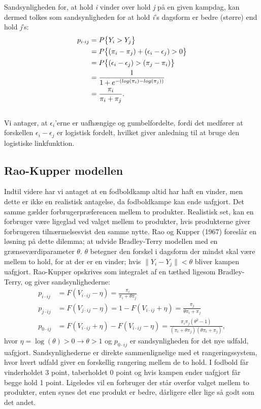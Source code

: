 \documentclass[11pt,a4paper]{article}
\begin{document}
Sandsynligheden for, at hold \textit{i} vinder over hold \textit{j} på en given kampdag, kan dermed tolkes som sandsynligheden for at hold \textit{i}'s dagsform er bedre (større) end hold \textit{j}'s:
\begin{align*}
p_{i\cdot ij}&=P\big{\{}Y_i>Y_j\big{\}}
\\&=P\big{\{}(\pi_i-\pi_j)+(\epsilon_i-\epsilon_j)>0\big{\}}
\\&=P\big{\{}(\epsilon_i-\epsilon_j)>(\pi_j-\pi_i)\big{\}}
\\&=\frac{1}{1+e^{-(log(\pi_i)-log(\pi_j))}} 
\\&=\frac{\pi_i}{\pi_i+\pi_j}.\;\;
\end{align*}
\\
Vi antager, at $\epsilon_i$'erne er uafhængige og gumbelfordelte, fordi det medfører at forskellen $\epsilon_i-\epsilon_j$ er logistisk fordelt, hvilket giver anledning til at bruge den logistiske linkfunktion.
\subsection{Rao-Kupper modellen}
Indtil videre har vi antaget at en fodboldkamp altid har haft en vinder, men dette er ikke en realistisk antagelse, da fodboldkampe kan ende uafgjort. Det samme gælder forbrugerpræferencen mellem to produkter. Realistisk set, kan en forbruger være ligeglad ved valget mellem to produkter, hvis produkterne giver forbrugeren tilnærmelsesvist den samme nytte. Rao og Kupper (1967) \cite{RaoKupper} foreslår en løsning på dette dilemma; at udvide Bradley-Terry modellen med en grænseværdiparameter $\theta$. $\theta$ betegner den forskel i dagsform der mindst skal være mellem to hold, for at der er en vinder; hvis $\|Y_i-Y_j\| < \theta$ bliver kampen uafgjort. Rao-Kupper opskrives som integralet af en tæthed ligesom Bradley-Terry, og giver sandsynlighederne:
\begin{equation}
\begin{split}
    p_{i\cdot ij}&=F(V_{i\cdot ij}-\eta)=\frac{\pi_i}{\pi_i+\theta \pi_j}\\
    p_{j\cdot ij}&=F(V_{j\cdot ij}-\eta)=1-F(V_{i\cdot ij}+\eta)=\frac{\pi_j}{\theta \pi_i+\pi_j}\\
    p_{0\cdot ij}&=F(V_{i\cdot ij}+\eta)-F(V_{i\cdot ij}-\eta)= \frac{\pi_i \pi_j(\theta^2 -1)}{(\pi_i+\theta \pi_j)(\theta \pi_i + \pi_j)} \label{Sandynligheder},
\end{split}
\end{equation}
hvor $\eta=\log(\theta)>0 \rightarrow\theta>1$ og $p_{0\cdot ij}$ er sandsynligheden for det nye udfald, uafgjort. Sandsynlighederne er direkte sammenlignelige med et rangeringssystem, hvor hvert udfald giver en forskellig rangering mellem de to hold. I fodbold får vinderholdet 3 point, taberholdet 0 point og hvis kampen ender uafgjort får begge hold 1 point. Ligeledes vil en forbruger der står overfor valget mellem to produkter, enten synes det ene produkt er bedre, dårligere eller lige så godt som det andet.
\end{document}
